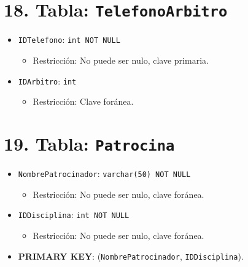 \section*{18. Tabla: \texttt{TelefonoArbitro}}
\begin{itemize}
    \item \texttt{IDTelefono}: \texttt{int NOT NULL}
    \begin{itemize}
        \item Restricción: No puede ser nulo, clave primaria.
    \end{itemize}
    \item \texttt{IDArbitro}: \texttt{int}
    \begin{itemize}
        \item Restricción: Clave foránea.
    \end{itemize}
\end{itemize}

\section*{19. Tabla: \texttt{Patrocina}}
\begin{itemize}
    \item \texttt{NombrePatrocinador}: \texttt{varchar(50) NOT NULL}
    \begin{itemize}
        \item Restricción: No puede ser nulo, clave foránea.
    \end{itemize}
    \item \texttt{IDDisciplina}: \texttt{int NOT NULL}
    \begin{itemize}
        \item Restricción: No puede ser nulo, clave foránea.
    \end{itemize}
    \item \textbf{PRIMARY KEY}: (\texttt{NombrePatrocinador}, \texttt{IDDisciplina}).
\end{itemize}

